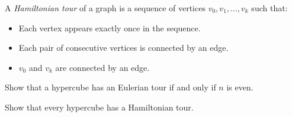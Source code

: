 \documentclass[11pt]{article}
\begin{document}
A \emph{Hamiltonian tour} of a graph is a sequence of vertices
$v_0, v_1, \ldots, v_k$ such that:
\begin{itemize}
    \item Each vertex appears exactly once in the sequence.
    \item Each pair of consecutive vertices is connected by an edge.
    \item $v_0$ and $v_k$ are connected by an edge.
\end{itemize}

\begin{Parts}

    \Part Show that a hypercube has an Eulerian tour if and only if $n$ is even.
    

    \Part Show that every hypercube has a Hamiltonian tour. 

\end{Parts}
\end{document}
